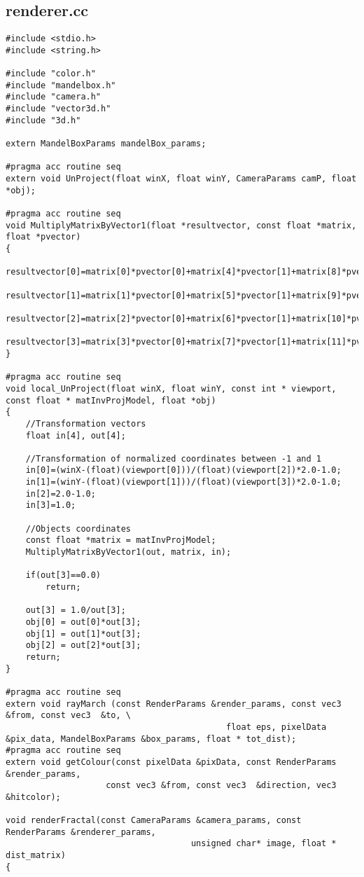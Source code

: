 \documentclass[]{article}
\begin{document}
\subsection{renderer.cc}\label{subsec:renderer.cc}
\begin{Verbatim}[fontsize= \footnotesize, tabsize=4]
#include <stdio.h>
#include <string.h>

#include "color.h"
#include "mandelbox.h"
#include "camera.h"
#include "vector3d.h"
#include "3d.h"

extern MandelBoxParams mandelBox_params;

#pragma acc routine seq
extern void UnProject(float winX, float winY, CameraParams camP, float *obj);

#pragma acc routine seq
void MultiplyMatrixByVector1(float *resultvector, const float *matrix, float *pvector)
{
	resultvector[0]=matrix[0]*pvector[0]+matrix[4]*pvector[1]+matrix[8]*pvector[2]+matrix[12]*pvector[3];
	resultvector[1]=matrix[1]*pvector[0]+matrix[5]*pvector[1]+matrix[9]*pvector[2]+matrix[13]*pvector[3];
	resultvector[2]=matrix[2]*pvector[0]+matrix[6]*pvector[1]+matrix[10]*pvector[2]+matrix[14]*pvector[3];
	resultvector[3]=matrix[3]*pvector[0]+matrix[7]*pvector[1]+matrix[11]*pvector[2]+matrix[15]*pvector[3];
}

#pragma acc routine seq
void local_UnProject(float winX, float winY, const int * viewport, const float * matInvProjModel, float *obj)
{
	//Transformation vectors
	float in[4], out[4];

	//Transformation of normalized coordinates between -1 and 1
	in[0]=(winX-(float)(viewport[0]))/(float)(viewport[2])*2.0-1.0;
	in[1]=(winY-(float)(viewport[1]))/(float)(viewport[3])*2.0-1.0;
	in[2]=2.0-1.0;
	in[3]=1.0;

	//Objects coordinates
	const float *matrix = matInvProjModel;
	MultiplyMatrixByVector1(out, matrix, in);

	if(out[3]==0.0)
		return;

	out[3] = 1.0/out[3];
	obj[0] = out[0]*out[3];
	obj[1] = out[1]*out[3];
	obj[2] = out[2]*out[3];
	return;
}

#pragma acc routine seq
extern void rayMarch (const RenderParams &render_params, const vec3 &from, const vec3  &to, \
											float eps, pixelData &pix_data, MandelBoxParams &box_params, float * tot_dist);
#pragma acc routine seq
extern void getColour(const pixelData &pixData, const RenderParams &render_params,
					const vec3 &from, const vec3  &direction, vec3 &hitcolor);

void renderFractal(const CameraParams &camera_params, const RenderParams &renderer_params,
									 unsigned char* image, float * dist_matrix)
{


\end{Verbatim}
\end{document}
